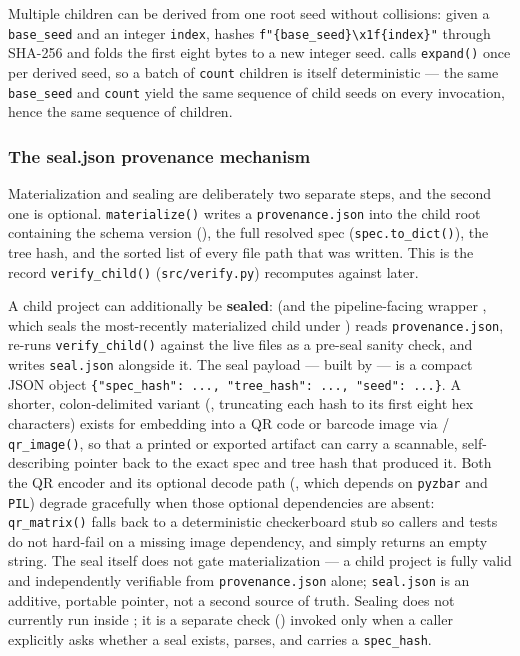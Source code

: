\documentclass[
]{article}
\begin{document}
Multiple children can be derived from one root seed without collisions:
given a \texttt{base\_seed} and an integer \texttt{index},
 hashes
\texttt{f"\{base\_seed\}\textbackslash{}x1f\{index\}"} through SHA-256
and folds the first eight bytes to a new integer seed.
 calls \texttt{expand()} once per
derived seed, so a batch of \texttt{count} children is itself
deterministic --- the same \texttt{base\_seed} and \texttt{count} yield
the same sequence of child seeds on every invocation, hence the same
sequence of children.

\subsubsection{The seal.json provenance
mechanism}\label{the-seal.json-provenance-mechanism}

Materialization and sealing are deliberately two separate steps, and the
second one is optional. \texttt{materialize()} writes a
\texttt{provenance.json} into the child root containing the schema
version
(),
the full resolved spec (\texttt{spec.to\_dict()}), the tree hash, and
the sorted list of every file path that was written. This is the record
\texttt{verify\_child()} (\texttt{src/verify.py}) recomputes against
later.

A child project can additionally be \textbf{sealed}:
 (and the pipeline-facing wrapper
, which seals the most-recently materialized
child under ) reads \texttt{provenance.json},
re-runs \texttt{verify\_child()} against the live files as a pre-seal
sanity check, and writes \texttt{seal.json} alongside it. The seal
payload --- built by  --- is a
compact JSON object
\texttt{\{"spec\_hash":\ ...,\ "tree\_hash":\ ...,\ "seed":\ ...\}}. A
shorter, colon-delimited variant (,
truncating each hash to its first eight hex characters) exists for
embedding into a QR code or barcode image via
 / \texttt{qr\_image()}, so that a
printed or exported artifact can carry a scannable, self-describing
pointer back to the exact spec and tree hash that produced it. Both the
QR encoder and its optional decode path (,
which depends on \texttt{pyzbar} and \texttt{PIL}) degrade gracefully
when those optional dependencies are absent: \texttt{qr\_matrix()} falls
back to a deterministic checkerboard stub so callers and tests do not
hard-fail on a missing image dependency, and 
simply returns an empty string. The seal itself does not gate
materialization --- a child project is fully valid and independently
verifiable from \texttt{provenance.json} alone; \texttt{seal.json} is an
additive, portable pointer, not a second source of truth. Sealing does
not currently run inside ; it is a
separate check () invoked only
when a caller explicitly asks whether a seal exists, parses, and carries
a \texttt{spec\_hash}.
\end{document}

